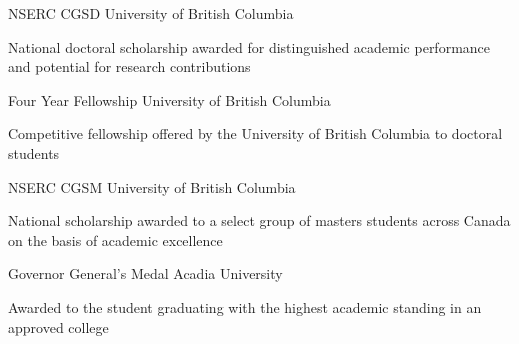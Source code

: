 
\begin{cventries}
    \cventrythree
    {NSERC CGSD} %
    {}
    {University of British Columbia} %
    {} %
    {\begin{cvitems} %
        \item National doctoral scholarship awarded for distinguished academic performance and potential for research contributions
    \end{cvitems}}

    \cventrythree
    {Four Year Fellowship} %
    {}
    {University of British Columbia} %
    {} %
    {\begin{cvitems} %
        \item Competitive fellowship offered by the University of British Columbia to doctoral students
    \end{cvitems}}

    \cventrythree
    {NSERC CGSM} %
    {} 
    {University of British Columbia} %
    {} %
    {\begin{cvitems} %
        \item National scholarship awarded to a select group of masters students across Canada on the basis of academic excellence
    \end{cvitems}}

    \cventrythree
    {Governor General's Medal} %
    {}
    {Acadia University} %
    {} %
    {\begin{cvitems} %
        \item  Awarded to the student graduating with the highest academic standing in an approved college
    \end{cvitems}}
\end{cventries}